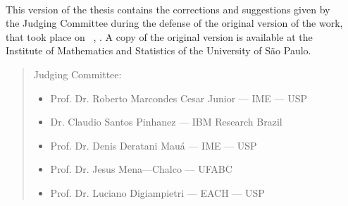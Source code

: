 \documentclass[11pt,twoside,a4paper]{book}
\begin{document}




%
%
%
%
\newpage
\thispagestyle{empty}
    \begin{center}
        \vspace*{2.3 cm}
        \textbf{\Large{\phdTitle}}\\
        \vspace*{2 cm}
    \end{center}

    \vskip 2cm

    \begin{flushright}
    This version of the thesis contains the corrections and suggestions given by\\
    the Judging Committee during the defense of the original version of the work,\\
    that took place on \thesisMonth~\thesisDay, \thesisYear. A copy of the original version is available at the\\
    Institute of Mathematics and Statistics of the
University of São Paulo.

    \vskip 2cm

    \end{flushright}
    \vskip 4.2cm

    \begin{quote}
    \noindent Judging Committee:
    
    \begin{itemize}
        \item Prof. Dr. Roberto Marcondes Cesar Junior --- IME --- USP
        \item Dr. Claudio Santos Pinhanez --- IBM Research Brazil
        \item Prof. Dr. Denis Deratani Mauá --- IME --- USP
        \item Prof. Dr. Jesus Mena---Chalco --- UFABC
        \item Prof. Dr. Luciano Digiampietri --- EACH --- USP
    \end{itemize}
      
    \end{quote}
\pagebreak
\end{document}
